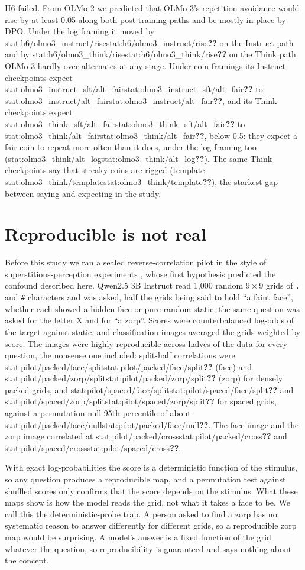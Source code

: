 \documentclass[11pt]{article}
\newcommand{\stat}[1]{\ifcsname stat:#1\endcsname\csname stat:#1\endcsname\else\textbf{??}\fi}
\begin{document}
H6 failed. From OLMo 2 we predicted that OLMo 3's repetition avoidance would rise by at least 0.05 along both post-training paths and be mostly in place by DPO. Under the log framing it moved by \stat{h6/olmo3_instruct/rise} on the Instruct path and by \stat{h6/olmo3_think/rise} on the Think path. OLMo 3 hardly over-alternates at any stage. Under coin framings its Instruct checkpoints expect \stat{olmo3_instruct_sft/alt_fair} to \stat{olmo3_instruct/alt_fair}, and its Think checkpoints expect \stat{olmo3_think_sft/alt_fair} to \stat{olmo3_think/alt_fair}, below 0.5: they expect a fair coin to repeat more often than it does, under the log framing too (\stat{olmo3_think/alt_log}). The same Think checkpoints say that streaky coins are rigged (template \stat{olmo3_think/template}), the starkest gap between saying and expecting in the study.

\section{Reproducible is not real}
\label{sec:trap}

Before this study we ran a sealed reverse-correlation pilot in the style of superstitious-perception experiments \citep{gosselin2003superstitious}, whose first hypothesis predicted the confound described here. Qwen2.5 3B Instruct read 1,000 random $9 \times 9$ grids of \texttt{.} and \texttt{\#} characters and was asked, half the grids being said to hold ``a faint face'', whether each showed a hidden face or pure random static; the same question was asked for the letter X and for ``a zorp''. Scores were counterbalanced log-odds of the target against static, and classification images averaged the grids weighted by score. The images were highly reproducible across halves of the data for every question, the nonsense one included: split-half correlations were \stat{pilot/packed/face/split} (face) and \stat{pilot/packed/zorp/split} (zorp) for densely packed grids, and \stat{pilot/spaced/face/split} and \stat{pilot/spaced/zorp/split} for spaced grids, against a permutation-null 95th percentile of about \stat{pilot/packed/face/null}. The face image and the zorp image correlated at \stat{pilot/packed/cross} and \stat{pilot/spaced/cross}.

With exact log-probabilities the score is a deterministic function of the stimulus, so any question produces a reproducible map, and a permutation test against shuffled scores only confirms that the score depends on the stimulus. What these maps show is how the model reads the grid, not what it takes a face to be. We call this the deterministic-probe trap. A person asked to find a zorp has no systematic reason to answer differently for different grids, so a reproducible zorp map would be surprising. A model's answer is a fixed function of the grid whatever the question, so reproducibility is guaranteed and says nothing about the concept.
\end{document}
